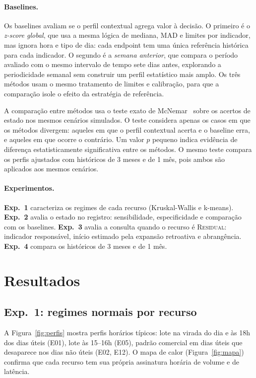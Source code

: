 \documentclass[sigconf,nonacm]{acmart}
\newcommand{\Residual}{\textsc{Residual}\xspace}
\begin{document}
\paragraph{Baselines.} Os baselines avaliam se o perfil contextual agrega valor à decisão. O primeiro é o \emph{z-score global}, que usa a mesma lógica de mediana, MAD e limites por indicador, mas ignora hora e tipo de dia: cada endpoint tem uma única referência histórica para cada indicador. O segundo é a \emph{semana anterior}, que compara o período avaliado com o mesmo intervalo de tempo sete dias antes, explorando a periodicidade semanal sem construir um perfil estatístico mais amplo. Os três métodos usam o mesmo tratamento de limites e calibração, para que a comparação isole o efeito da estratégia de referência.

A comparação entre métodos usa o teste exato de McNemar~\citep{mcnemar1947note} sobre os acertos de estado nos mesmos cenários simulados. O teste considera apenas os casos em que os métodos divergem: aqueles em que o perfil contextual acerta e o baseline erra, e aqueles em que ocorre o contrário. Um valor $p$ pequeno indica evidência de diferença estatisticamente significativa entre os métodos. O mesmo teste compara os perfis ajustados com históricos de 3 meses e de 1 mês, pois ambos são aplicados aos mesmos cenários.

\paragraph{Experimentos.} \textbf{Exp.~1} caracteriza os regimes de cada recurso (Kruskal-Wallis e k-means). \textbf{Exp.~2} avalia o estado no registro: sensibilidade, especificidade e comparação com os baselines. \textbf{Exp.~3} avalia a consulta quando o recurso é \Residual: indicador responsável, início estimado pela expansão retroativa e abrangência. \textbf{Exp.~4} compara os históricos de 3 meses e de 1 mês.

\section{Resultados}\label{sec:resultados}

\subsection{Exp.~1: regimes normais por recurso}

A Figura~\ref{fig:perfis} mostra perfis horários típicos: lote na virada do dia e às 18h dos dias úteis (E01), lote às 15--16h (E05), padrão comercial em dias úteis que desaparece nos dias não úteis (E02, E12). O mapa de calor (Figura~\ref{fig:mapa}) confirma que cada recurso tem sua própria assinatura horária de volume e de latência.
\end{document}
